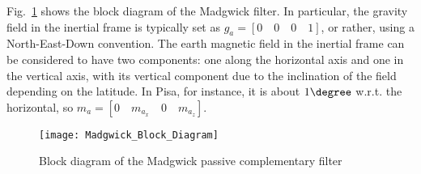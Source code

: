 Fig.~\ref{BlockDiagram} shows the block diagram of the Madgwick filter. 
In particular, the gravity field in the inertial frame is typically set as $g_a = [0 \quad 0 \quad 0 \quad 1]$, or rather, using a North-East-Down convention. The earth magnetic field in the inertial frame can be considered to have two components: one along the horizontal axis and one in the vertical axis, with its vertical component due to the inclination of the field depending on the latitude. In Pisa, for instance, it is about $1\degree$ w.r.t. the horizontal, so $m_a = [0 \quad m_{a_x} \quad 0 \quad m_{a_z}]$.

\begin{figure}[t]
\texttt{[image: Madgwick\_Block\_Diagram]}
\caption{Block diagram of the Madgwick passive complementary filter}
\label{BlockDiagram}
\end{figure}


